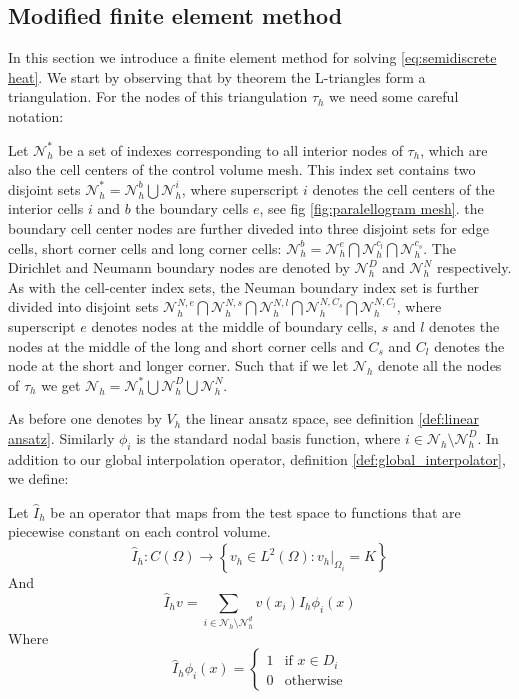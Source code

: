\documentclass[../Main/main.tex]{subfiles}
\begin{document}
	\subsection*{Modified finite element method}
	In this section we introduce a finite element method for solving \eqref{eq:semidiscrete heat}. We start by observing that by theorem  the L-triangles form a triangulation. For the nodes of this triangulation $\tau_h$ we need some careful notation:
	\par 
	Let $\mathcal{N}_h^*$ be a set of indexes corresponding to all interior nodes of $\tau_h$, which are also the cell centers of the control volume mesh. This index set contains two disjoint sets $\mathcal{N}_h^* = \mathcal{N}_h^b \bigcup \mathcal{N}_h^i$, where superscript $i$ denotes the cell centers of the interior cells $i$ and $b$ the boundary cells $e$, see fig \ref{fig:paralellogram mesh}. the boundary cell center nodes are further diveded into three disjoint sets for edge cells, short corner cells and long corner cells: $\mathcal{N}^b_h = \mathcal{N}_h^e \bigcap \mathcal{N}_h^{c_l} \bigcap \mathcal{N}_h^{c_s}$. The Dirichlet and Neumann boundary nodes are denoted by $\mathcal{N}_h^D$ and $\mathcal{N}_h^N$ respectively. As with the cell-center index sets, the Neuman boundary index set is further divided into disjoint sets $\mathcal{N}_h^{N,e}\bigcap \mathcal{N}_h^{N,s}\bigcap\mathcal{N}_h^{N,l}\bigcap \mathcal{N}_h^{N,C_s}\bigcap\mathcal{N}_h^{N,C_l}$, where superscript $e$ denotes nodes at the middle of boundary cells, $s$ and $l$ denotes the nodes at the middle of the long and short corner cells and $C_s$ and $C_l$ denotes the node at the short and longer corner. Such that if we let $\mathcal{N}_h$ denote all the nodes of $\tau_h$ we get $\mathcal{N}_h = \mathcal{N}_h^*\bigcup \mathcal{N}_h^D \bigcup \mathcal{N}_h^N$.
	\par 
	As before one denotes by $V_h$ the linear ansatz space, see definition \ref{def:linear ansatz}. Similarly $\phi_i$ is the standard nodal basis function, where $i \in \mathcal{N}_h \setminus \mathcal{N}_h^D$.
	In addition to our global interpolation operator, definition \ref{def:global_interpolator}, we define:
	\begin{definition}
		Let $\hat{I}_h$ be an operator that maps from the test space to functions that are piecewise constant on each control volume.
		\begin{equation*}
			\hat{I}_h:C(\Omega)\rightarrow \left \{ v_h \in L^2(\Omega):v_h|_{\Omega_i} = K \right \}
		\end{equation*}
		And
		\begin{equation*}
			\hat{I}_h v = \sum_{i\in \mathcal{N}_h\setminus\mathcal{N}_h^d}v(x_i)\hat{I}_h\phi_i(x)
		\end{equation*}
		Where
		\begin{equation}
			\hat{I}_h\phi_i(x)=\left\{\begin{matrix}
				1 & \text{if } x\in D_i\\ 
				0 & \text{otherwise}
			\end{matrix}\right.
		\end{equation}
	\end{definition}
\end{document}
